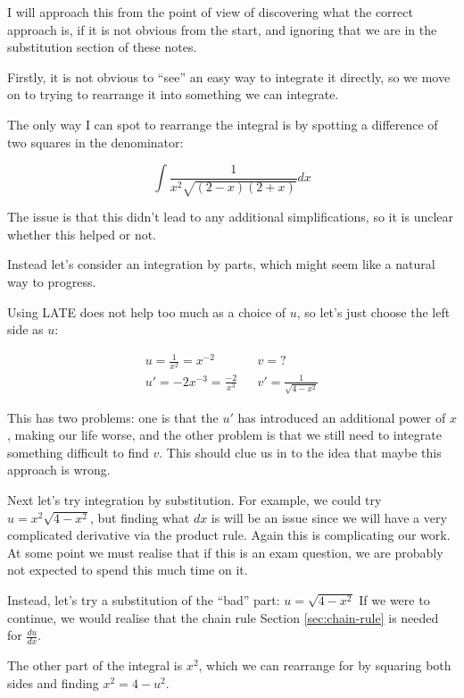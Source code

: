 \begin{solution}
    I will approach this from the point of view of discovering what the correct approach is, if it is not obvious from the start, and ignoring that 
    we are in the substitution section of these notes.

    Firstly, it is not obvious to ``see'' an easy way to integrate it directly, so we move on to 
    trying to rearrange it into something we can integrate.

    The only way I can spot to rearrange the integral is by spotting a difference of two squares in the denominator:

    \[ \int \frac{1}{x^2 \sqrt{(2-x)(2+x)}}dx\]

    The issue is that this didn't lead to any additional simplifications, so it is unclear whether this helped or not.

    Instead let's consider an integration by parts, which might seem like a natural way to progress.

    Using LATE does not help too much as a choice of $u$, so let's just choose the left side as $u$:

    \begin{align}
        u=\frac{1}{x^2}=x^{-2} & & v=? \\
        u' = -2x^{-3} = \frac{-2}{x^3} & & v' = \frac{1}{\sqrt{4 - x^2}}
    \end{align}

    This has two problems: one is that the $u'$ has introduced an additional power of $x$, making our life worse, and the other problem is that 
    we still need to integrate something difficult to find $v$. This should clue us in to the idea that maybe this approach is wrong.

    Next let's try integration by substitution. For example, we could try $u= x^2\sqrt{4 - x^2}$, but finding what $dx$ is will be an issue since we will have a very complicated derivative via the product rule. Again 
    this is complicating our work. At some point we must realise that if this is an exam question, we are probably not expected to spend this much time on it.

    Instead, let's try a substitution of the ``bad'' part: $u = \sqrt{4 - x^2} $ If we were to continue, we would realise that the chain rule Section \ref{sec:chain-rule} is needed for $\frac{du }{dx}$.

    The other part of the integral is $x^2$, which we can rearrange for by squaring both sides and finding $x^2 = 4 - u^2$.


\end{solution}
